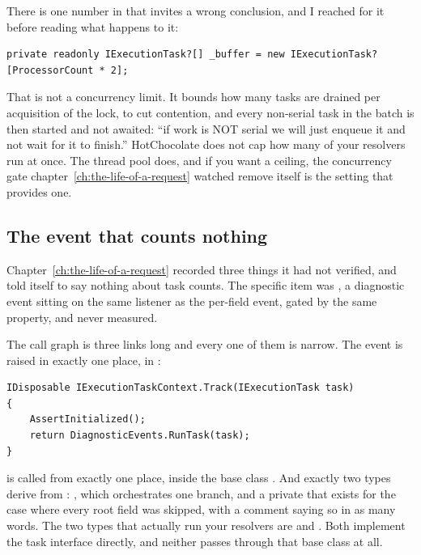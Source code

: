 %
There is one number in  that invites a wrong
conclusion, and I reached for it before reading what happens to it:

\begin{verbatim}
private readonly IExecutionTask?[] _buffer = new IExecutionTask?[ProcessorCount * 2];
\end{verbatim}

That is not a concurrency limit. It bounds how many tasks are drained per
acquisition of the lock, to cut contention, and every non-serial task in the
batch is then started and not awaited: \enquote{if work is NOT serial we will
just enqueue it and not wait for it to finish.} HotChocolate does not cap how
many of your resolvers run at once. The thread pool does, and if you want a
ceiling, the concurrency gate chapter~\ref{ch:the-life-of-a-request} watched
remove itself is the setting that provides one.

\subsection*{The event that counts nothing}

%
Chapter~\ref{ch:the-life-of-a-request} recorded three things it had not
verified, and told itself to say nothing about task counts. The specific item
was , a diagnostic event sitting on the same listener as the
per-field event, gated by the same property, and never measured.

The call graph is three links long and every one of them is narrow. The event is
raised in exactly one place, in
:

\begin{verbatim}
IDisposable IExecutionTaskContext.Track(IExecutionTask task)
{
    AssertInitialized();
    return DiagnosticEvents.RunTask(task);
}
\end{verbatim}

 is called from exactly one place, inside the base class
. And exactly two types derive from :
, which orchestrates one  branch, and a private
 that exists for the case where every root field was
skipped, with a comment saying so in as many words. The two types that actually
run your resolvers are  and . Both
implement the task interface directly, and neither passes through that base
class at all.

